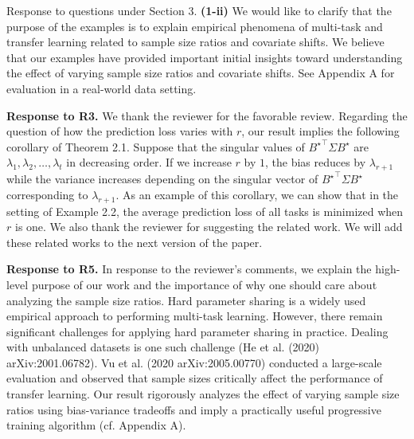 \documentclass{article}
\begin{document}
	Response to questions under Section 3.
	\textbf{(1-ii)} We would like to clarify that the purpose of the examples is to explain empirical phenomena of multi-task and transfer learning related to sample size ratios and covariate shifts.
	We believe that our examples have provided important initial insights toward understanding the effect of varying sample size ratios and covariate shifts.
	See Appendix A for evaluation in a real-world data setting.

	\textbf{Response to R3.}
	We thank the reviewer for the favorable review.
	Regarding the question of how the prediction loss varies with $r$, our result implies the following corollary of Theorem 2.1.
	Suppose that the singular values of ${B^{\star}}^{\top}\Sigma B^{\star}$ are $\lambda_1, \lambda_2, \dots, \lambda_t$ in decreasing order.
	If we increase $r$ by $1$, the bias reduces by $\lambda_{r+1}$ while the variance increases depending on the singular vector of  ${B^{\star}}^{\top}\Sigma B^{\star}$ corresponding to $\lambda_{r+1}$.
	As an example of this corollary, we can show that in the setting of Example 2.2, the average prediction loss of all tasks is minimized when $r$ is one.
	We also thank the reviewer for suggesting the related work.
	We will add these related works to the next version of the paper.

	\textbf{Response to R5.}
	In response to the reviewer's comments, we explain the high-level purpose of our work and the importance of why one should care about analyzing the sample size ratios.
	Hard parameter sharing is a widely used empirical approach to performing multi-task learning.
	However, there remain significant challenges for applying hard parameter sharing in practice.
	Dealing with unbalanced datasets is one such challenge (He et al. (2020) arXiv:2001.06782).
	Vu et al. (2020 arXiv:2005.00770) conducted a large-scale evaluation and observed that sample sizes critically affect the performance of transfer learning.
	Our result rigorously analyzes the effect of varying sample size ratios using bias-variance tradeoffs and imply a practically useful progressive training algorithm (cf. Appendix A).
\end{document}
